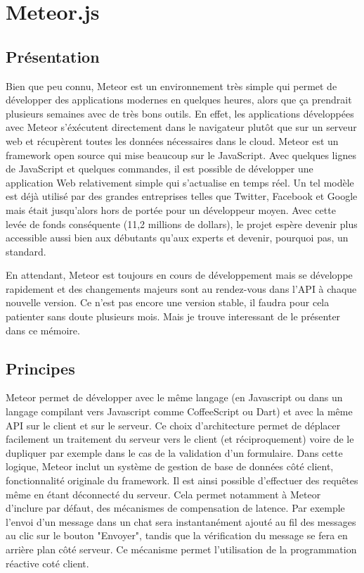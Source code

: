 \section{Meteor.js}
\label{ch:meteor}

\subsection{Présentation}

Bien que peu connu, Meteor est un environnement très simple qui permet de développer des applications modernes en quelques heures, alors que ça prendrait plusieurs semaines avec de très bons outils. 
En effet, les applications développées avec Meteor s’éxécutent directement dans le navigateur plutôt que sur un serveur web et récupèrent toutes les données nécessaires dans le cloud.
Meteor est un framework open source qui mise beaucoup sur le JavaScript. Avec quelques lignes de JavaScript et quelques commandes, il est possible de développer une application Web relativement simple qui s’actualise en temps réel.
Un tel modèle est déjà utilisé par des grandes entreprises telles que Twitter, Facebook et Google mais était jusqu’alors hors de portée pour un développeur moyen. Avec cette levée de fonds conséquente (11,2 millions de dollars), le projet espère devenir plus accessible aussi bien aux débutants qu’aux experts et devenir, pourquoi pas, un standard.

En attendant, Meteor est toujours en cours de développement mais se développe rapidement et des changements majeurs sont au rendez-vous dans l’API à chaque nouvelle version. Ce n’est pas encore une version stable, il faudra pour cela patienter sans doute plusieurs mois. Mais je trouve interessant de le présenter dans ce mémoire.

\subsection{Principes}

Meteor permet de développer avec le même langage (en Javascript ou dans un langage compilant vers Javascript comme CoffeeScript ou Dart) et avec la même API sur le client et sur le serveur. Ce choix d’architecture permet de déplacer facilement un traitement du serveur vers le client (et réciproquement) voire de le dupliquer par exemple dans le cas de la validation d'un formulaire.
Dans cette logique, Meteor inclut un système de gestion de base de données côté client, fonctionnalité originale du framework. Il est ainsi possible d'effectuer des requêtes même en étant déconnecté du serveur. Cela permet notamment à Meteor d'inclure par défaut, des mécanismes de compensation de latence. Par exemple l'envoi d'un message dans un chat sera instantanément ajouté au fil des messages au clic sur le bouton "Envoyer", tandis que la vérification du message se fera en arrière plan côté serveur. Ce mécanisme permet l'utilisation de la programmation réactive coté client.

